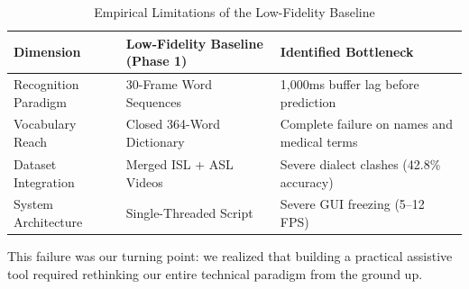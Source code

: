 \begin{table}[htbp]
\centering
\caption{Empirical Limitations of the Low-Fidelity Baseline}
\label{tab:baseline_comparison}
\begin{tabular}{@{}lll@{}}
\toprule
\textbf{Dimension} & \textbf{Low-Fidelity Baseline (Phase 1)} & \textbf{Identified Bottleneck} \\
\midrule
Recognition Paradigm & 30-Frame Word Sequences & 1,000ms buffer lag before prediction \\
Vocabulary Reach & Closed 364-Word Dictionary & Complete failure on names and medical terms \\
Dataset Integration & Merged ISL + ASL Videos & Severe dialect clashes (42.8\% accuracy) \\
System Architecture & Single-Threaded Script & Severe GUI freezing (5--12 FPS) \\
\bottomrule
\end{tabular}
\end{table}

This failure was our turning point: we realized that building a practical assistive tool required rethinking our entire technical paradigm from the ground up.
